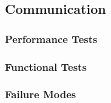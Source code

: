 
\subsection{Communication}
\label{sec:verification_comm}

\subsubsection{Performance Tests}
\label{sec:comm_pt}

\subsubsection{Functional Tests}
\label{sec:comm_ft}

\subsubsection{Failure Modes}
\label{sec:comm_fm}
